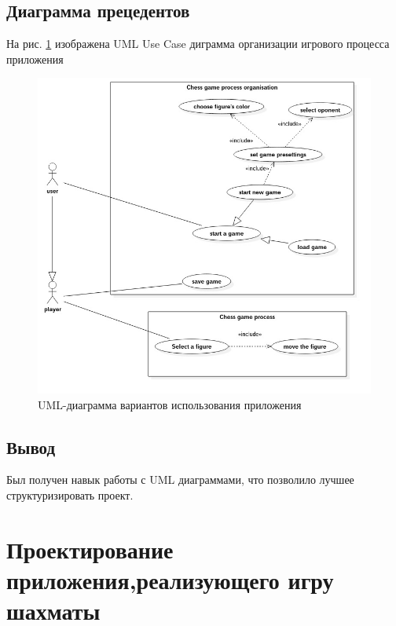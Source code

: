 \subsection*{Диаграмма прецедентов}
На рис. \ref{pic:UseCaseDiagramm} изображена UML Use Case диграмма организации игрового процесса приложения
\begin{figure}[H]
	\begin{center}
		\includegraphics[scale=0.7]{../diagramms/UseCaseDia.jpg}
		\caption{UML-диаграмма вариантов использования приложения} 
		\label{pic:UseCaseDiagramm} %
	\end{center}
\end{figure}

\subsection*{Вывод}
Был получен навык работы с UML диаграммами, что позволило лучшее структуризировать проект.

\section*{Проектирование приложения,реализующего игру шахматы}

